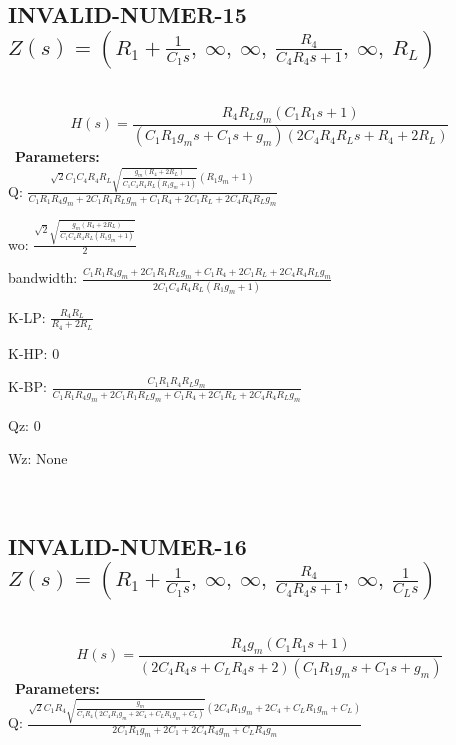 \documentclass{article}
\begin{document}
\subsection{INVALID-NUMER-15 $Z(s) = \left( R_{1} + \frac{1}{C_{1} s}, \  \infty, \  \infty, \  \frac{R_{4}}{C_{4} R_{4} s + 1}, \  \infty, \  R_{L}\right)$ } \ 
\textbf{\[H(s) = \frac{R_{4} R_{L} g_{m} \left(C_{1} R_{1} s + 1\right)}{\left(C_{1} R_{1} g_{m} s + C_{1} s + g_{m}\right) \left(2 C_{4} R_{4} R_{L} s + R_{4} + 2 R_{L}\right)}\] } \ 
\textbf{Parameters:}\\ 

Q: $\frac{\sqrt{2} C_{1} C_{4} R_{4} R_{L} \sqrt{\frac{g_{m} \left(R_{4} + 2 R_{L}\right)}{C_{1} C_{4} R_{4} R_{L} \left(R_{1} g_{m} + 1\right)}} \left(R_{1} g_{m} + 1\right)}{C_{1} R_{1} R_{4} g_{m} + 2 C_{1} R_{1} R_{L} g_{m} + C_{1} R_{4} + 2 C_{1} R_{L} + 2 C_{4} R_{4} R_{L} g_{m}}$\ 

wo: $\frac{\sqrt{2} \sqrt{\frac{g_{m} \left(R_{4} + 2 R_{L}\right)}{C_{1} C_{4} R_{4} R_{L} \left(R_{1} g_{m} + 1\right)}}}{2}$\ 

bandwidth: $\frac{C_{1} R_{1} R_{4} g_{m} + 2 C_{1} R_{1} R_{L} g_{m} + C_{1} R_{4} + 2 C_{1} R_{L} + 2 C_{4} R_{4} R_{L} g_{m}}{2 C_{1} C_{4} R_{4} R_{L} \left(R_{1} g_{m} + 1\right)}$\ 

K-LP: $\frac{R_{4} R_{L}}{R_{4} + 2 R_{L}}$\ 

K-HP: $0$\ 

K-BP: $\frac{C_{1} R_{1} R_{4} R_{L} g_{m}}{C_{1} R_{1} R_{4} g_{m} + 2 C_{1} R_{1} R_{L} g_{m} + C_{1} R_{4} + 2 C_{1} R_{L} + 2 C_{4} R_{4} R_{L} g_{m}}$\ 

Qz: $0$\ 

Wz: $\text{None}$\ 

\ 

\subsection{INVALID-NUMER-16 $Z(s) = \left( R_{1} + \frac{1}{C_{1} s}, \  \infty, \  \infty, \  \frac{R_{4}}{C_{4} R_{4} s + 1}, \  \infty, \  \frac{1}{C_{L} s}\right)$ } \ 
\textbf{\[H(s) = \frac{R_{4} g_{m} \left(C_{1} R_{1} s + 1\right)}{\left(2 C_{4} R_{4} s + C_{L} R_{4} s + 2\right) \left(C_{1} R_{1} g_{m} s + C_{1} s + g_{m}\right)}\] } \ 
\textbf{Parameters:}\\ 

Q: $\frac{\sqrt{2} C_{1} R_{4} \sqrt{\frac{g_{m}}{C_{1} R_{4} \left(2 C_{4} R_{1} g_{m} + 2 C_{4} + C_{L} R_{1} g_{m} + C_{L}\right)}} \left(2 C_{4} R_{1} g_{m} + 2 C_{4} + C_{L} R_{1} g_{m} + C_{L}\right)}{2 C_{1} R_{1} g_{m} + 2 C_{1} + 2 C_{4} R_{4} g_{m} + C_{L} R_{4} g_{m}}$\ 
\end{document}
